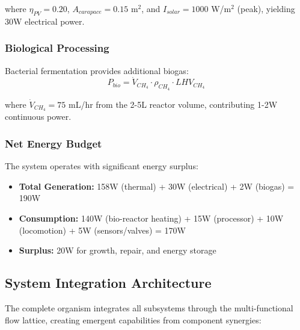 where $\eta_{PV} = 0.20$, $A_{carapace} = 0.15$ m$^2$, and $I_{solar} = 1000$ W/m$^2$ (peak), yielding 30W electrical power.

\subsubsection{Biological Processing}
Bacterial fermentation provides additional biogas:
\begin{equation}
    P_{bio} = \dot{V}_{CH_4} \cdot \rho_{CH_4} \cdot LHV_{CH_4}
\end{equation}

where $\dot{V}_{CH_4} = 75$ mL/hr from the 2-5L reactor volume, contributing 1-2W continuous power.

\subsubsection{Net Energy Budget}
The system operates with significant energy surplus:
\begin{itemize}
    \item \textbf{Total Generation:} 158W (thermal) + 30W (electrical) + 2W (biogas) = 190W
    \item \textbf{Consumption:} 140W (bio-reactor heating) + 15W (processor) + 10W (locomotion) + 5W (sensors/valves) = 170W
    \item \textbf{Surplus:} 20W for growth, repair, and energy storage
\end{itemize}

\subsection{System Integration Architecture}

The complete organism integrates all subsystems through the multi-functional flow lattice, creating emergent capabilities from component synergies:

